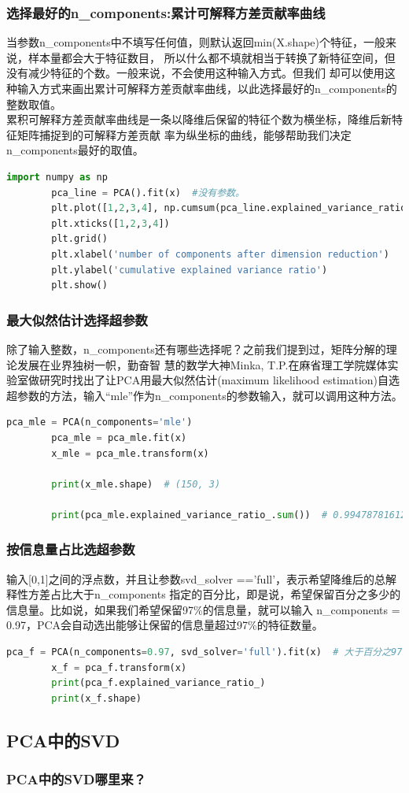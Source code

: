 \documentclass{article}
\begin{document}
	\subsubsection{选择最好的n\_components:累计可解释方差贡献率曲线}
	当参数n\_components中不填写任何值，则默认返回min(X.shape)个特征，一般来说，样本量都会大于特征数目，
	所以什么都不填就相当于转换了新特征空间，但没有减少特征的个数。一般来说，不会使用这种输入方式。但我们
	却可以使用这种输入方式来画出累计可解释方差贡献率曲线，以此选择最好的n\_components的整数取值。\\
	累积可解释方差贡献率曲线是一条以降维后保留的特征个数为横坐标，降维后新特征矩阵捕捉到的可解释方差贡献
	率为纵坐标的曲线，能够帮助我们决定n\_components最好的取值。
	
	\begin{lstlisting}[language = python]
		import numpy as np
		pca_line = PCA().fit(x)  #没有参数。
		plt.plot([1,2,3,4], np.cumsum(pca_line.explained_variance_ratio_))
		plt.xticks([1,2,3,4])
		plt.grid()
		plt.xlabel('number of components after dimension reduction')
		plt.ylabel('cumulative explained variance ratio')
		plt.show()
	\end{lstlisting}
	
	\subsubsection{最大似然估计选择超参数}
	
	除了输入整数，n\_components还有哪些选择呢？之前我们提到过，矩阵分解的理论发展在业界独树一帜，勤奋智
	慧的数学大神Minka, T.P.在麻省理工学院媒体实验室做研究时找出了让PCA用最大似然估计(maximum likelihood
	estimation)自选超参数的方法，输入“mle”作为n\_components的参数输入，就可以调用这种方法。
	
	\begin{lstlisting}[language = python]
		pca_mle = PCA(n_components='mle')
		pca_mle = pca_mle.fit(x)
		x_mle = pca_mle.transform(x)
		
		print(x_mle.shape)  # (150, 3)
		
		print(pca_mle.explained_variance_ratio_.sum())  # 0.9947878161267248
	\end{lstlisting}
	
	
	\subsubsection{按信息量占比选超参数}
	
	输入[0,1]之间的浮点数，并且让参数svd\_solver =='full'，表示希望降维后的总解释性方差占比大于n\_components
	指定的百分比，即是说，希望保留百分之多少的信息量。比如说，如果我们希望保留97\%的信息量，就可以输入
	n\_components = 0.97，PCA会自动选出能够让保留的信息量超过97\%的特征数量。
	
	\begin{lstlisting}[language = python]
		pca_f = PCA(n_components=0.97, svd_solver='full').fit(x)  # 大于百分之97即可。
		x_f = pca_f.transform(x)
		print(pca_f.explained_variance_ratio_)
		print(x_f.shape)
	\end{lstlisting}
	
	\subsection{PCA中的SVD}
	\subsubsection{PCA中的SVD哪里来？}
	
	
\end{document}
